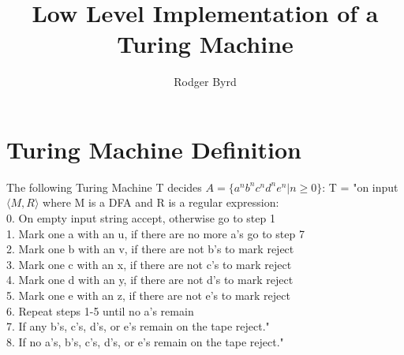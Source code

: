 \documentclass{article}
\begin{document}
\raggedright

\title{Low Level Implementation of a Turing Machine}
\author{Rodger Byrd}
\maketitle

\section{Turing Machine Definition}
The following Turing Machine T decides $A=\{a^{n}b^{n}c^{n}d^{n}e^{n} \vert n \geq 0\}$:\break
T = "on input $\langle M,R\rangle$ where M is a DFA and R is a regular expression:\\
\hspace{20 pt} 0. On empty input string accept, otherwise go to step 1\\
\hspace{20 pt} 1. Mark one a with an u, if there are no more a's go to step 7\\
\hspace{20 pt} 2. Mark one b with an v, if there are not b's to mark reject\\
\hspace{20 pt} 3. Mark one c with an x, if there are not c's to mark reject\\
\hspace{20 pt} 4. Mark one d with an y, if there are not d's to mark reject\\
\hspace{20 pt} 5. Mark one e with an z, if there are not e's to mark reject\\
\hspace{20 pt} 6. Repeat steps 1-5 until no a's remain\\
\hspace{20 pt} 7. If any b's, c's, d's, or e's remain on the tape reject."\\
\hspace{20 pt} 8. If no a's, b's, c's, d's, or e's remain on the tape reject."
\end{document}
